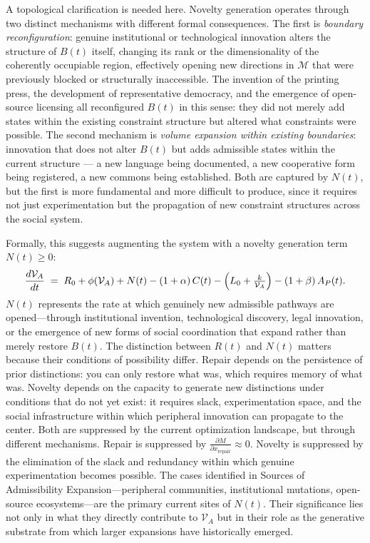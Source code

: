 \documentclass[11pt, letterpaper]{article}
\begin{document}
A topological clarification is needed here. Novelty generation operates through two distinct mechanisms with different formal consequences. The first is \emph{boundary reconfiguration}: genuine institutional or technological innovation alters the structure of $B(t)$ itself, changing its rank or the dimensionality of the coherently occupiable region, effectively opening new directions in $\mathcal{M}$ that were previously blocked or structurally inaccessible. The invention of the printing press, the development of representative democracy, and the emergence of open-source licensing all reconfigured $B(t)$ in this sense: they did not merely add states within the existing constraint structure but altered what constraints were possible. The second mechanism is \emph{volume expansion within existing boundaries}: innovation that does not alter $B(t)$ but adds admissible states within the current structure --- a new language being documented, a new cooperative form being registered, a new commons being established. Both are captured by $N(t)$, but the first is more fundamental and more difficult to produce, since it requires not just experimentation but the propagation of new constraint structures across the social system.

Formally, this suggests augmenting the system with a novelty generation term $N(t) \geq 0$:
\[
  \frac{d\mathcal{V}_A}{dt} \;=\; R_0 + \phi(\mathcal{V}_A) + N(t) - (1+\alpha)\,C(t) - \Bigl(L_0 + \tfrac{k}{\mathcal{V}_A}\Bigr) - (1+\beta)\,A_P(t).
\]
$N(t)$ represents the rate at which genuinely new admissible pathways are opened---through institutional invention, technological discovery, legal innovation, or the emergence of new forms of social coordination that expand rather than merely restore $B(t)$. The distinction between $R(t)$ and $N(t)$ matters because their conditions of possibility differ. Repair depends on the persistence of prior distinctions: you can only restore what was, which requires memory of what was. Novelty depends on the capacity to generate new distinctions under conditions that do not yet exist: it requires slack, experimentation space, and the social infrastructure within which peripheral innovation can propagate to the center. Both are suppressed by the current optimization landscape, but through different mechanisms. Repair is suppressed by $\frac{\partial M}{\partial x_{\text{repair}}} \approx 0$. Novelty is suppressed by the elimination of the slack and redundancy within which genuine experimentation becomes possible. The cases identified in Sources of Admissibility Expansion---peripheral communities, institutional mutations, open-source ecosystems---are the primary current sites of $N(t)$. Their significance lies not only in what they directly contribute to $\mathcal{V}_A$ but in their role as the generative substrate from which larger expansions have historically emerged.
\end{document}
